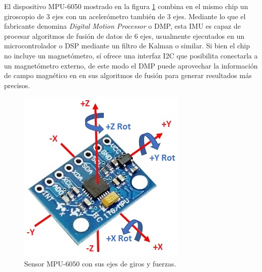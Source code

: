 El dispositivo MPU-6050 mostrado en la figura \ref{fig:mpu6050} combina en el mismo chip un giroscopio de 3 ejes con un acelerómetro también de 3 ejes. Mediante lo que el fabricante denomina \textit{Digital Motion Processor} o DMP, esta IMU es capaz de procesar algoritmos de fusión de datos de 6 ejes, usualmente ejecutados en un microcontrolador o DSP mediante un filtro de Kalman o similar. Si bien el chip no incluye un magnetómetro, sí ofrece una interfaz I2C que posibilita conectarla a un magnetómetro externo, de este modo el DMP puede aprovechar la información de campo magnético en en sus algoritmos de fusión para generar resultados más precisos.

\begin{figure}[ht]
    \centering
    \includegraphics[scale=0.45]{./Figures/mpu6050.jpg}
    \caption{Sensor MPU-6050 con sus ejes de giros y fuerzas.}
    \label{fig:mpu6050}
\end{figure}